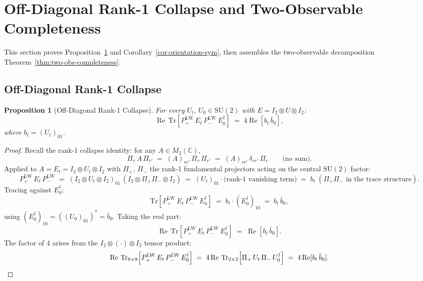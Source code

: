 \documentclass[12pt]{article}
\numberwithin{equation}{section}
\theoremstyle{plain}
\newtheorem{proposition}{Proposition}[section]
\theoremstyle{definition}
\theoremstyle{remark}
\newcommand{\su}{\mathrm{SU}}              %
\newcommand{\tr}{\mathrm{Tr}}              %
\newcommand{\Cplx}{\mathbb{C}}             %
\newcommand{\PLW}{P^{\mathrm{LW}}}         %
\newcommand{\Pip}{\Pi_{+}}                 %
\newcommand{\Pim}{\Pi_{-}}                 %
\newcommand{\Pir}{\Pi_{r}}                 %
\begin{document}
	\section{Off-Diagonal Rank-1 Collapse and Two-Observable Completeness}
	\label{sec:two-obs-decomp-section}
	
	This section proves Proposition~\ref{prop:off-diag-collapse} and
	Corollary~\ref{cor:orientation-sym}, then assembles the two-observable
	decomposition Theorem~\ref{thm:two-obs-completeness}.
	
	\subsection{Off-Diagonal Rank-1 Collapse}
	\label{sec:off-diag-collapse}
	
	\begin{proposition}[Off-Diagonal Rank-1 Collapse]
		\label{prop:off-diag-collapse}
		For every $U_t,\,U_0\in\su(2)$ with $E = I_2\otimes U\otimes I_2$:
		\begin{equation}
			\operatorname{Re}\,\tr\!\left[\PLW_+\, E_t\,\PLW_-\,
			E_0^{\dagger}\right]
			\;=\; 4\operatorname{Re}[b_t\,\bar{b}_0],
			\label{eq:off-diag-collapse}
		\end{equation}
		where $b_t = (U_t)_{01}$.
	\end{proposition}
	
	\begin{proof}
		Recall the rank-1 collapse identity: for any $A\in M_2(\Cplx)$,
		\[
		\Pir\, A\,\Pi_{r'}
		\;=\; (A)_{rr'}\,\Pir\,\Pi_{r'}
		\;=\; (A)_{rr'}\,\delta_{rr'}\,\Pir
		\qquad \text{(no sum).}
		\]
		Applied to $A = E_t = I_2\otimes U_t\otimes I_2$ with
		$\Pip,\,\Pim$ the rank-1 fundamental projectors acting on the
		central $\su(2)$ factor:
		\[
		\PLW_+\, E_t\,\PLW_-
		\;=\; (I_2\otimes U_t\otimes I_2)_{01}\,
		(I_2\otimes\Pip\Pim\otimes I_2)
		\;=\; (U_t)_{01}\cdot\text{(rank-1 vanishing term)}
		\;=\; b_t\;(\Pip\Pim\text{ in the trace structure}).
		\]
		Tracing against $E_0^{\dagger}$:
		\[
		\tr\!\left[\PLW_+\, E_t\,\PLW_-\, E_0^{\dagger}\right]
		\;=\; b_t\cdot(E_0^{\dagger})_{10}
		\;=\; b_t\,\bar{b}_0,
		\]
		using $(E_0^{\dagger})_{10} = ((U_0)_{01})^{*} = \bar{b}_0$.
		Taking the real part:
		\[
		\operatorname{Re}\,\tr\!\left[\PLW_+\, E_t\,\PLW_-\,
		E_0^{\dagger}\right]
		\;=\; \operatorname{Re}[b_t\,\bar{b}_0].
		\]
		The factor of $4$ arises from the $I_2\otimes(\cdot)\otimes I_2$
		tensor product:
		\[
		\operatorname{Re}\,\tr_{8\times 8}\!
		\left[\PLW_+\, E_t\,\PLW_-\, E_0^{\dagger}\right]
		\;=\; 4\operatorname{Re}\,\tr_{2\times 2}\!
		\left[\Pip\, U_t\,\Pim\, U_0^{\dagger}\right]
		\;=\; 4\operatorname{Re}[b_t\,\bar{b}_0]. \qedhere
		\]
	\end{proof}
	
\end{document}

